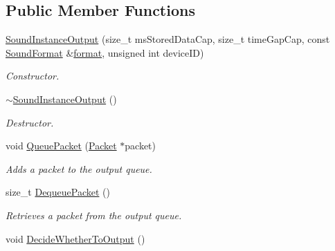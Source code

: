 \subsection*{Public Member Functions}
\begin{DoxyCompactItemize}
\item 
\hyperlink{class_sound_instance_output_a85e36931e8ce76829bdc92a2232a9d60}{SoundInstanceOutput} (size\_\-t msStoredDataCap, size\_\-t timeGapCap, const \hyperlink{class_sound_format}{SoundFormat} \&\hyperlink{class_sound_instance_output_a6f868bc7e7610066ccb2ff8616a2ab4a}{format}, unsigned int deviceID)
\begin{DoxyCompactList}\small\item\em Constructor. \item\end{DoxyCompactList}\item 
\hypertarget{class_sound_instance_output_a4aa0679614c6830427fbc351aa652f4e}{
\hyperlink{class_sound_instance_output_a4aa0679614c6830427fbc351aa652f4e}{$\sim$SoundInstanceOutput} ()}
\label{class_sound_instance_output_a4aa0679614c6830427fbc351aa652f4e}

\begin{DoxyCompactList}\small\item\em Destructor. \item\end{DoxyCompactList}\item 
void \hyperlink{class_sound_instance_output_aaa831c4469fe0211ca1950763f837ce4}{QueuePacket} (\hyperlink{class_packet}{Packet} $\ast$packet)
\begin{DoxyCompactList}\small\item\em Adds a packet to the output queue. \item\end{DoxyCompactList}\item 
size\_\-t \hyperlink{class_sound_instance_output_a850fb81ed7d2c491a23bacdd097875d8}{DequeuePacket} ()
\begin{DoxyCompactList}\small\item\em Retrieves a packet from the output queue. \item\end{DoxyCompactList}\item 
\hypertarget{class_sound_instance_output_af6616e6b3eeb69450a4f4933503aead4}{
void \hyperlink{class_sound_instance_output_af6616e6b3eeb69450a4f4933503aead4}{DecideWhetherToOutput} ()}
\label{class_sound_instance_output_af6616e6b3eeb69450a4f4933503aead4}


\end{DoxyCompactItemize}
